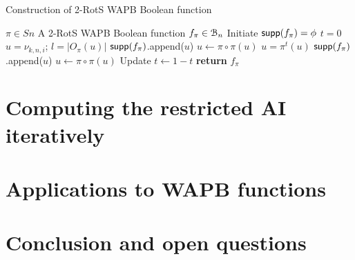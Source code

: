 \documentclass[11pt]{llncs}
\begin{document}
\begin{constr}
	\caption{Construction of 2-RotS WAPB Boolean function\label{cons:GA}}
	\begin{algorithmic}
		\Require $\pi \in Sn$ %
		\Ensure A 2-RotS WAPB Boolean function $f_\pi \in \mathcal{B}_n$
		\State Initiate $\mathsf{supp}(f_\pi) = \phi$
		\State $t = 0$
		\State $u = \nu_{k,n,i}$; $l= |O_\pi(u)|$
		\State $\mathsf{supp}(f_\pi)$.append($u$)
		\State $ u \gets \pi \circ \pi(u)$
		\EndFor
		\Else
		\State $u = \pi^{t}(u)$
		\State $\mathsf{supp}(f_\pi)$.append($u$)
		\State $ u \gets \pi \circ \pi(u)$ 
		\EndFor 
		\State Update $t \gets 1 - t$
		\EndIf
		\EndFor
		\EndFor
		\State \textbf{return} $f_\pi$
	\end{algorithmic}
	
\end{constr}

\section{Computing the restricted AI iteratively}\label{sec:IterativeApproach}


\section{Applications to WAPB functions}

\section{Conclusion and open questions}




\newpage



\ifnum{}


\else


\fi

\end{document}
